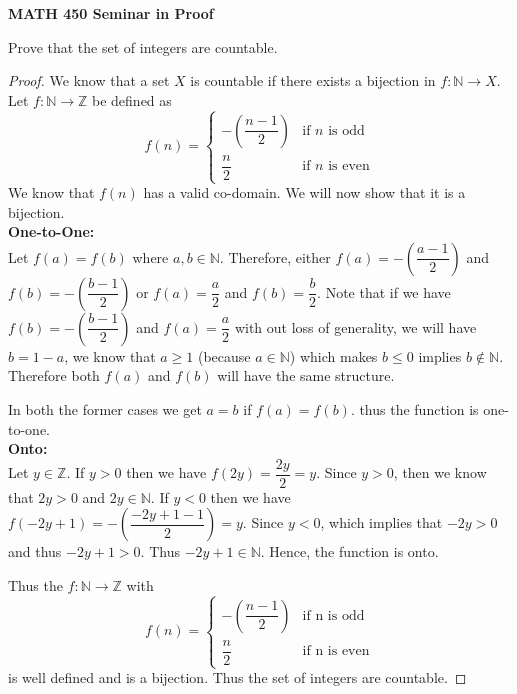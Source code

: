 \documentclass[14pt]{article}
\newcommand{\Z}{\mathbb Z}
\newcommand{\N}{\mathbb N}
\begin{document}
\begin{center}
		
{\bf MATH 450 Seminar in Proof}
 \\
\end{center}
	Prove that the set of integers are countable.
\begin{proof}
	 We know that a set $X$ is countable if there exists a bijection in $f: \N \rightarrow X$.
	 Let $f: \N \rightarrow \Z$ be defined as \[
f(n) =
\begin{cases}
 - \left( \dfrac{n-1}{2} \right) & \text{if } n \text{ is odd} \\
 \dfrac{n}{2} & \text{if } n \text{ is even}
\end{cases}
\]
We know that $f(n)$ has a valid co-domain. We will now show that it is a bijection. \\ 
\textbf{One-to-One: \\}
Let $f(a) = f(b)$ where $a,b \in \N$. Therefore, either $f(a) = - \left( \dfrac{a-1}{2} \right)$ and $f(b) = - \left( \dfrac{b-1}{2} \right)$ or $f(a) = \dfrac{a}{2}$ and $f(b) = \dfrac{b}{2}$. 
Note that if we have $f(b) = - \left( \dfrac{b-1}{2} \right)$ and $f(a) = \dfrac{a}{2}$ with out loss of generality, we will have $b = 1 - a$, we know that $a \geq 1$ (because $a \in \N$) which makes $b \leq 0$ implies $b \notin \N$. Therefore both $f(a)$ and $f(b)$ will have the same structure.


In both the former cases we get $a=b$ if $f(a) = f(b)$. thus the function is one-to-one.\\
\textbf{Onto: \\}
Let $y \in \Z$. If $y > 0$ then we have $f(2y) = \dfrac{2y}{2} = y$. Since $y > 0$, then we know that $2y >0$ and $2y \in \N$. If $y < 0$ then we have $ f(-2y + 1) = - \left( \dfrac{-2y + 1-1}{2} \right) = y$. Since $y <0$, which implies that $-2y > 0$ and thus $-2y + 1 > 0$. Thus $-2y+1 \in \N$. Hence, the function is onto.

Thus the $f:\N \rightarrow \Z$ with \[
f(n) =
\begin{cases}
 - \left( \dfrac{n-1}{2} \right) & \text{if n is odd} \\
 \dfrac{n}{2} & \text{if n is even}
\end{cases}
\] is well defined and is a bijection. Thus the set of integers are countable.
\end{proof}
\end{document}
